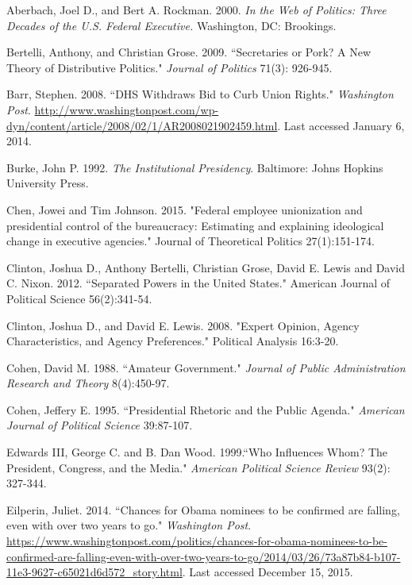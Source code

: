 \documentclass[12pt]{article}
\begin{document}
\noindent \hangindent=0.7cm Aberbach, Joel D., and Bert A. Rockman. 2000. \textit{In the Web of Politics: Three Decades of the U.S. Federal Executive.} Washington, DC: Brookings.

\noindent \hangindent=0.7cm Bertelli, Anthony, and Christian Grose. 2009. ``Secretaries or Pork? A New Theory of Distributive Politics." \textit{Journal of Politics} 71(3): 926-945. 

\noindent \hangindent=0.7cm Barr, Stephen. 2008. ``DHS Withdraws Bid to Curb Union Rights." \textit{Washington Post}. \url{http://www.washingtonpost.com/wp-dyn/content/article/2008/02/1/AR2008021902459.html}. Last accessed January 6, 2014.

\noindent \hangindent=0.7cm Burke, John P. 1992. \textit{The Institutional Presidency}. Baltimore: Johns Hopkins University Press. 

\noindent \hangindent=0.7cm Chen, Jowei and Tim Johnson. 2015. "Federal employee unionization and presidential control of the bureaucracy: Estimating and explaining ideological change in executive agencies." Journal of Theoretical Politics 27(1):151-174.

\noindent \hangindent=0.7cm Clinton, Joshua D., Anthony Bertelli, Christian Grose, David E. Lewis and David C. Nixon. 2012. ``Separated Powers in the United States." American Journal of Political Science 56(2):341-54.

\noindent \hangindent=0.7cm Clinton, Joshua D., and David E. Lewis. 2008. "Expert Opinion, Agency Characteristics, and Agency Preferences." Political Analysis 16:3-20.

\noindent \hangindent=0.7cm Cohen, David M. 1988. ``Amateur Government." \textit{Journal of Public Administration Research and Theory} 8(4):450-97. 

\noindent \hangindent=0.7cm Cohen, Jeffery E. 1995. ``Presidential Rhetoric and the Public Agenda." \textit{American Journal of Political Science} 39:87-107. 

\noindent \hangindent=0.7cm Edwards III, George C. and B. Dan Wood. 1999.``Who Influences Whom? The President, Congress, and the Media." \textit{American Political Science Review} 93(2): 327-344.

\noindent \hangindent=0.7cm Eilperin, Juliet. 2014. ``Chances for Obama nominees to be confirmed are falling, even with over two years to go." \textit{Washington Post}. \url{https://www.washingtonpost.com/politics/chances-for-obama-nominees-to-be-confirmed-are-falling-even-with-over-two-years-to-go/2014/03/26/73a87b84-b107-11e3-9627-c65021d6d572_story.html}. Last accessed December 15, 2015. 
\end{document}
